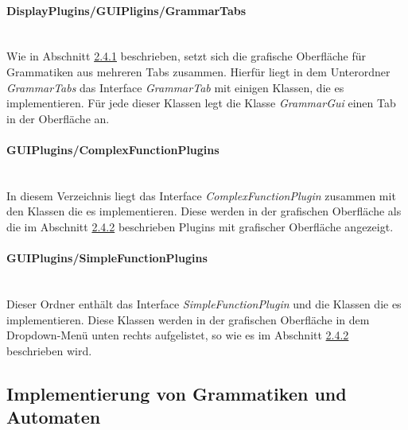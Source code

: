 \paragraph{DisplayPlugins/GUIPligins/GrammarTabs}\ \\
Wie in Abschnitt \hyperref[sec:2.4.1]{2.4.1} beschrieben, setzt sich die grafische Oberfläche für Grammatiken aus mehreren Tabs zusammen. Hierfür liegt in dem Unterordner \textit{GrammarTabs} das Interface \textit{GrammarTab} mit einigen Klassen, die es implementieren. Für jede dieser Klassen legt die Klasse \textit{GrammarGui} einen Tab in der Oberfläche an.
\paragraph{GUIPlugins/ComplexFunctionPlugins}\ \\
In diesem Verzeichnis liegt das Interface \textit{ComplexFunctionPlugin} zusammen mit den Klassen die es implementieren. Diese werden in der grafischen Oberfläche als die im Abschnitt \hyperref[sec:2.4.2.1]{2.4.2} beschrieben Plugins mit grafischer Oberfläche angezeigt.
\paragraph{GUIPlugins/SimpleFunctionPlugins}\ \\
Dieser Ordner enthält das Interface \textit{SimpleFunctionPlugin} und die Klassen die es implementieren. Diese Klassen werden in der grafischen Oberfläche in dem Dropdown-Menü unten rechts aufgelistet, so wie es im Abschnitt \hyperref[sec:2.4.2.2]{2.4.2} beschrieben wird.
\subsection{Implementierung von Grammatiken und Automaten}
\label{sec:3.2}
